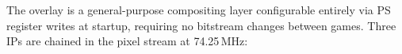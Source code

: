 




The overlay is a general-purpose compositing layer configurable entirely 
via PS register writes at startup, requiring no bitstream changes between 
games. Three IPs are chained in the pixel stream at 74.25\,MHz:

